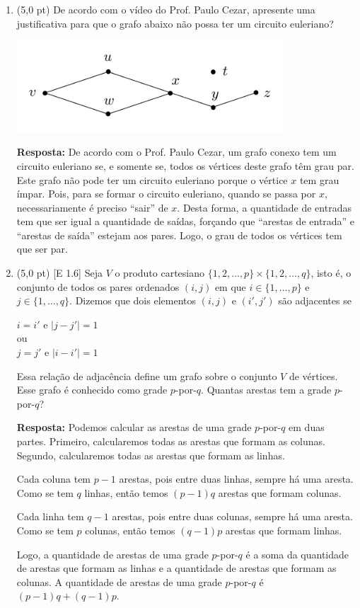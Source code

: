\documentclass[12pt,a4paper,oneside]{article}
\begin{document}
\begin{enumerate}

	\item (5,0 pt) De acordo com o vídeo do Prof. Paulo Cezar, apresente uma justificativa para que o grafo abaixo não possa ter um circuito euleriano?
	\begin{center}
	    \includegraphics[width=10cm]{images/grafo.png}
	\end{center}
	
	{\color{blue} {\bf Resposta:} De acordo com o Prof. Paulo Cezar, um grafo conexo tem um circuito euleriano se, e somente se, todos os vértices deste grafo têm grau par. Este grafo não pode ter um circuito euleriano porque o vértice $x$ tem grau ímpar. Pois, para se formar o circuito euleriano, quando se passa por $x$, necessariamente é preciso ``sair'' de $x$. Desta forma, a quantidade de entradas tem que ser igual a quantidade de saídas, forçando que ``arestas de entrada'' e ``arestas de saída'' estejam aos pares. Logo, o grau de todos os vértices tem que ser par. }
	
	\newpage
	
	\item (5,0 pt) [E 1.6] Seja $V$ o produto cartesiano $\{1,2, \ldots, p\} \times \{1,2, \ldots, q\}$, isto é, o conjunto de todos os pares ordenados $(i,j)$ em que $i \in \{1, \ldots, p\}$ e  $j \in \{1, \ldots, q\}$. Dizemos que dois elementos $(i,j)$ e $(i',j')$ são adjacentes se 
	\begin{center}
	    $i = i'$ e $|j - j'|=1$ \\
	    ou \\
	    $j = j'$ e $|i - i'|=1$
	\end{center}
	Essa relação de adjacência define um grafo sobre o conjunto $V$ de vértices. Esse grafo é conhecido como grade $p$-por-$q$. Quantas arestas tem a grade $p$-por-$q$?
	
	{\color{blue} {\bf Resposta:} Podemos calcular as arestas de uma grade $p$-por-$q$ em duas partes. Primeiro, calcularemos todas as arestas que formam as colunas. Segundo, calcularemos todas as arestas que formam as linhas. 
	
	Cada coluna tem $p-1$ arestas, pois entre duas linhas, sempre há uma aresta. Como se tem $q$ linhas, então temos $(p-1)q$ arestas que formam colunas.
	
	Cada linha tem $q-1$ arestas, pois entre duas colunas, sempre há uma aresta. Como se tem $p$ colunas, então temos $(q-1)p$ arestas que formam linhas.
	
	Logo, a quantidade de arestas de uma grade $p$-por-$q$ é a soma da quantidade de arestas que formam as linhas e a quantidade de arestas que formam as colunas. A quantidade de arestas de uma grade $p$-por-$q$  é $(p-1)q + (q-1)p$.}
	
	\end{enumerate}
\end{document}
